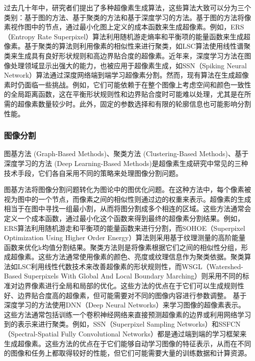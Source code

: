 过去几十年中，研究者们提出了多种超像素生成算法，这些算法大致可以分为三个类别：基于图的方法、基于聚类的方法和基于深度学习的方法。基于图的方法将像素视作图中的节点，通过最小化图上定义的成本函数来生成超像素。例如，ERS（Entropy Rate Superpixel）算法利用随机游走熵率和平衡项的能量函数来生成超像素。基于聚类的算法则利用像素的相似性来进行聚类，如LSC算法使用线性谱聚类来生成具有良好形状规则和高边界贴合度的超像素。近年来，深度学习方法在图像处理领域显示出强大的能力，也被应用于超像素生成，如SSN（Spiking Neural Network）算法通过深度网络端到端学习超像素分割。然而，现有算法在生成超像素时仍面临一些挑战。例如，它们可能依赖于在整个图像上考虑空间和颜色一致性的全局距离函数，这在平衡形状规则性和边界贴合度时可能难以处理，尤其是在所需的超像素数量较少时。此外，固定的参数选择和有限的轮廓信息也可能影响分割性能。\cite{贾耕云2018基于超像素的}

\subsubsection{图像分割}
图基方法 (Graph-Based Methods)、聚类方法 (Clustering-Based Methods)、基于深度学习的方法 (Deep Learning-Based Methods)是超像素生成研究中常见的三种技术手段，它们各自采用不同的策略来处理图像分割问题。

图基方法将图像分割问题转化为图论中的图优化问题。在这种方法中，每个像素被视为图中的一个节点，而像素之间的相似性则通过边的权重来表示。超像素的生成相当于在图中寻找一组最小割，从而将图分割成多个相连的区域。这些方法通常会定义一个成本函数，通过最小化这个函数来得到最终的超像素分割结果。例如，ERS算法利用随机游走和平衡项的能量函数来进行分割，而SOHOE（Superpixel Optimization Using Higher Order Energy）算法则采用基于纹理测量的高阶能量函数来优化k均值分割结果。聚类方法则是将像素根据它们之间的相似性分组，形成超像素。这些方法通常使用像素的颜色、亮度或纹理信息作为聚类依据。聚类算法如LSC利用线性代数技术来改善超像素的形状规则性，而WSGL（Watershed-Based Superpixels With Global And Local Boundary Marching）则采用不同的标准对边界像素进行全局和局部的优化。\cite{JSJA2022S2084}这些方法的优点在于它们可以生成规则性好、边界贴合度高的超像素，但可能需要对不同的图像内容进行参数调整。
基于深度学习的方法使用DNN（Deep Neural Networks）来学习图像的超像素表示。这些方法通常包括训练一个卷积神经网络来直接预测超像素的边界或利用网络学习到的表示来进行聚类。例如，SSN（Superpixel Sampling Networks）和SSFCN（Spectral-Spatial Fully Convolutional Networks）都是通过端到端的学习框架来生成超像素。这些方法的优点在于它们能够自动学习图像的特征表示，从而在不同的图像和任务上都取得较好的性能，但它们可能需要大量的训练数据和计算资源。


